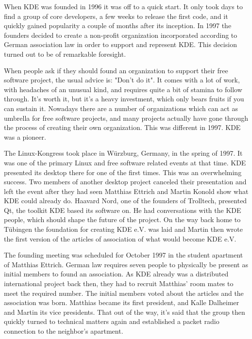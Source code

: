 

\noindent{}When KDE was founded in 1996 it was off to a quick start. It only took days to find a group of core developers, a few weeks to release the first code, and it quickly gained popularity a couple of months after its inception. In 1997 the founders decided to create a non-profit organization incorporated according to German association law in order to support and represent KDE. This decision turned out to be of remarkable foresight.

When people ask if they should found an organization to support their free software project, the usual advice is: "Don't do it". It comes with a lot of work, with headaches of an unusual kind, and requires quite a bit of stamina to follow through. It's worth it, but it's a heavy investment, which only bears fruits if you can sustain it. Nowadays there are a number of organizations which can act as umbrella for free software projects, and many projects actually have gone through the process of creating their own organization. This was different in 1997. KDE was a pioneer.

The Linux-Kongress took place in Würzburg, Germany, in the spring of 1997. It was one of the primary Linux and free software related events at that time. KDE presented its desktop there for one of the first times. This was an overwhelming success. Two members of another desktop project canceled their presentation and left the event after they had seen Matthias Ettrich and Martin Konold show what KDE could already do. Haavard Nord, one of the founders of Trolltech, presented Qt, the toolkit KDE based its software on. He had conversations with the KDE people, which should shape the future of the project. On the way back home to Tübingen the foundation for creating KDE e.V. was laid and Martin then wrote the first version of the articles of association of what would become KDE e.V.

The founding meeting was scheduled for October 1997 in the student apartment of Matthias Ettrich. German law requires seven people to physically be present as initial members to found an association. As KDE already was a distributed international project back then, they had to recruit Matthias' room mates to meet the required number. The initial members voted about the articles and the association was born. Matthias became its first president, and Kalle Dalheimer and Martin its vice presidents. That out of the way, it's said that the group then quickly turned to technical matters again and established a packet radio connection to the neighbor's apartment.

